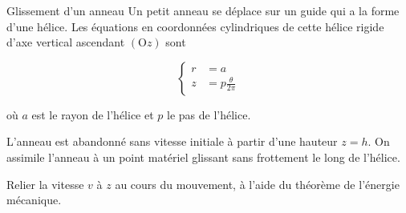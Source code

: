 \begin{exo}[PC][1][colle]{Glissement d'un anneau}
Un petit anneau se déplace sur un guide qui a la forme d'une hélice. Les équations en coordonnées cylindriques de cette hélice rigide d'axe vertical ascendant $(\mathrm{O} z)$ sont

$$
\left\{\begin{aligned}
r & =a \\
z & =p \frac{\theta}{2 \pi}
\end{aligned}\right.
$$

où $a$ est le rayon de l'hélice et $p$ le pas de l'hélice.

L'anneau est abandonné sans vitesse initiale à partir d'une hauteur $z=h$. On assimile l'anneau à un point matériel glissant sans frottement le long de l'hélice.

\begin{quest}
  \item Relier la vitesse $v$ à $z$ au cours du mouvement, à l'aide du théorème de l'énergie mécanique.
\end{quest}
\end{exo}


